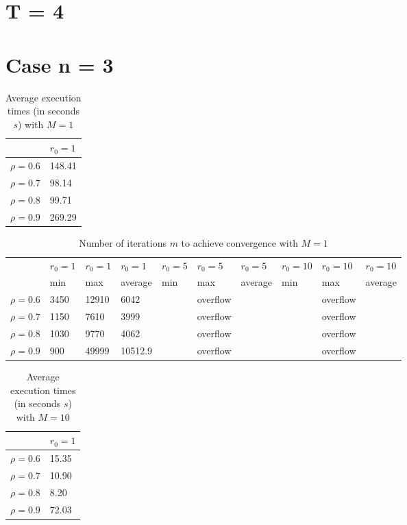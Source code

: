 \documentclass[a4paper,11pt,openright]{report}
\begin{document}
\section{T = 4}
\section*{Case n = 3} 
\begin{table}[H]
\centering
\addtolength{\leftskip}{-1.5cm}
\addtolength{\rightskip}{-1.5cm}
\begin{tabular}{|c|l|}
\hline
$ $ & $r_0 = 1$ \\
\hline
$\rho = 0.6$ & 148.41 \\

$\rho = 0.7$ & 98.14 \\

$\rho = 0.8$ & 99.71 \\

$\rho = 0.9$ & 269.29 \\
\hline
\end{tabular}
\caption{Average execution
 times (in seconds $s$) with $M = 1$}
\end{table}
\begin{table}[H]
\centering
\addtolength{\leftskip}{-1.5cm}
\addtolength{\rightskip}{-1.5cm}
\begin{tabular}{|c|lllllllll|}
\hline
$ $ & $r_0 = 1$ & $r_0 = 1$ & $r_0 = 1$ & $r_0 = 5$ & $r_0 = 5$ & $r_0 = 5$ & $r_0 = 10$ & $r_0 = 10$ & $r_0 = 10$  \\
$ $ & min & max & average & min & max & average & min & max & average \\ 
\hline
$\rho = 0.6$ & 3450 & 12910 & 6042 &  & overflow &  &  & overflow &  \\

$\rho = 0.7$ & 1150 & 7610 & 3999 &  & overflow &  &  & overflow &  \\

$\rho = 0.8$ & 1030 & 9770 & 4062 &  & overflow &  &  & overflow & \\

$\rho = 0.9$ & 900 & 49999 & 10512.9 &  & overflow &  &  & overflow & \\
\hline
\end{tabular}
\caption{Number of iterations $m$ to achieve convergence with $M = 1$}
\end{table}
\begin{table}[H]
\centering
\addtolength{\leftskip}{-1.5cm}
\addtolength{\rightskip}{-1.5cm}
\begin{tabular}{|c|l|}
\hline
$ $ & $r_0 = 1$  \\
\hline
$\rho = 0.6$ & 15.35  \\

$\rho = 0.7$ & 10.90 \\

$\rho = 0.8$ & 8.20 \\

$\rho = 0.9$ & 72.03 \\
\hline
\end{tabular}
\caption{Average execution
 times (in seconds $s$) with $M = 10$}
\end{table}
\end{document}

